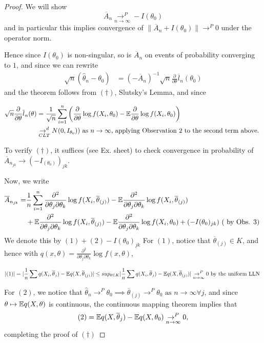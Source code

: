 \documentclass[a4paper]{article}
\begin{document}
\begin{proof}
	We will show
	\[
		\overline{A}_n \underset{n\to \infty}{\to ^{P}} -I(\theta_0) \tag{\dagger}
	\]
	and in particular this implies convergence of $\|\overline{A}_n + I(\theta_0)\| \to ^{P} 0$ under the operator norm.

	Hence since $I(\theta_0)$ is non-singular, so is $\overline{A}_n$ on events of probability converging to $1$, and since we can rewrite
	\begin{align*}
		\sqrt{n}(\hat{\theta}_n - \theta_0) &= (-\overline{A}_n)^{-1} \sqrt{n} \frac{\partial}{\partial\theta} \overline{l}_n(\theta_0)   
	 \end{align*}
	 and the theorem follows from $(\dagger)$, Slutsky's Lemma, and since

	  \begin{align*}
		  \sqrt{n}\frac{\partial}{\partial\theta}\overline{l}_n(\theta) &= \frac{1}{\sqrt{n}} \sum_{i=1}^{n} \left( \frac{\partial}{\partial\theta} \log f(X_i, \theta_0) - \mathbb{E} \frac{\partial}{\partial\theta} \log f(X_i,\theta_0) \right) \\
		  & \underset{CLT}{\to ^{d}} N(0, I_{\theta_0})) \text{ as $n\to \infty$, applying Observation 2 to the second term above. } 
	 \end{align*}

	 To verify $(\dagger)$, it suffices (see Ex. sheet) to check convergence in probability of $\overline{A}_{n_{jk}}\to (-I_(\theta_0))_{jk}$.

	 Now, we write
	 \begin{align*}
		 \overline{A}_{n_{jk}} = &\frac{1}{n} \sum_{i=1}^{n}\frac{\partial^2}{\partial\theta_j \partial\theta_k} \log f(X_i, \overline{\theta}_{(j)}) - \mathbb{E} \frac{\partial^2}{\partial\theta_j \partial\theta_k} \log f(X_i, \overline{\theta}_{(j)}) \\
		 &+ \mathbb{E} \frac{\partial^2}{\partial\theta_j \partial\theta_k} \log f(X_i, \overline{\theta}_{(j)}) - \mathbb{E} \frac{\partial^2}{\partial\theta_j \partial\theta_k} \log f(X_i, \theta_0) + (-I(\theta_0)_{jk}) \text{ ( by Obs. 3) } 
	 \end{align*}
	 We denote this by $(1) + (2) - I(\theta_0)_{jk}$
	 For $(1)$, notice that $\overline{\theta}_{(j)} \in K$, and hence with $q(x,\theta) = \frac{\partial^2}{\partial\theta_j \partial\theta_k} \log f(x, \theta)$,

	 \[
		 |(1)| = |\frac{1}{n} \sum q(X_i, \overline{\theta}_j) - \mathbb{E} q(X, \overline{\theta}_{(j)})| \le sup_{\theta \in K} |\frac{1}{n} \sum q(X_i, \overline{\theta}_j) - \mathbb{E} q(X, \overline{\theta}_{(j)})| \underset{n\to \infty}{\to ^{P}} 0 \text{ by the uniform LLN }
	 \] 

	 For $(2)$, we notice that  $\hat{\theta}_n \to ^{P} \theta_0 \implies \overline{\theta}_{(j)} \to ^{P} \theta_0 \text{ as } n\to \infty \forall j$, and since $\theta \mapsto \mathbb{E} q(X,\theta)$ is continuous, the continuous mapping theorem implies that 
	 \[
		 (2) = \mathbb{E} q(X, \overline{\theta}_j) - \mathbb{E} q(X, \theta_0) \underset{n\to \infty}{\to ^{P}} 0
	 ,\]
	 completing the proof of $(\dagger)$

\end{proof}
\end{document}
